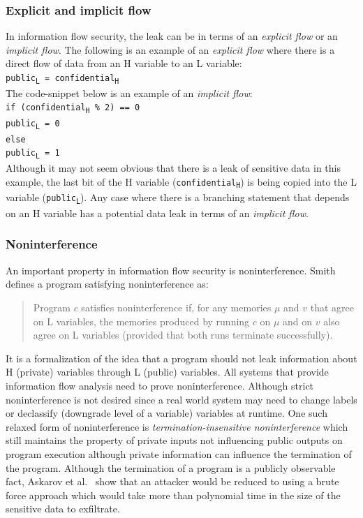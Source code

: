 \subsubsection{Explicit and implicit flow}
In information flow security, the leak can be in terms of an \textit{explicit flow}
or an \textit{implicit flow}. The following is an example of an \textit{explicit flow} where there is a direct
flow of data from an H variable to an L variable: \\
\indent
\texttt{public\textsubscript{L} = confidential\textsubscript{H}}
\eject
\noindent \\
The code-snippet below is an example of an \textit{implicit flow}: \\
\indent
	\texttt{if (confidential\textsubscript{H} \% 2)  == 0 \\ \indent \indent
		public\textsubscript{L} = 0 \\ \indent
	else \\ \indent \indent
		public\textsubscript{L} = 1} \\
\noindent Although it may not seem obvious that there is a leak of sensitive data
in this example, the last bit of the H variable (\texttt{confidential\textsubscript{H}})
is being copied into the L variable (\texttt{public\textsubscript{L}}). Any case
where there is a branching statement that depends on an H variable has a potential
data leak in terms of an \textit{implicit flow}.

\subsubsection{Noninterference \label{sec:noninterference}}
An important property in information flow security is noninterference. Smith~\cite{PrincInfoSec}
defines a program satisfying noninterference as:

\begin{quotation}
	\noindent Program $c$ satisfies noninterference if, for
	any memories $\mu$ and $v$ that agree on L variables, the memories produced by
	running $c$ on $\mu$ and on $v$ also agree on L variables (provided that both runs
	terminate successfully).
\end{quotation}
It is a formalization of the idea that a program should not leak
information about H (private) variables through L (public) variables. All systems
that provide information flow analysis need to prove noninterference. Although
strict noninterference is not desired since a real world system may need to change
labels or declassify (downgrade level of a variable) variables at runtime. One such
relaxed form of noninterference is \textit{termination-insensitive noninterference}
which still maintains the property of private inputs not influencing public outputs
on program execution although private information can influence the termination of
the program. Although the termination of a program is a publicly observable fact,
Askarov et al.~\cite{TINI} show that an attacker would be reduced to using a brute
force approach which would take more than polynomial time in the size of the
sensitive data to exfiltrate.

